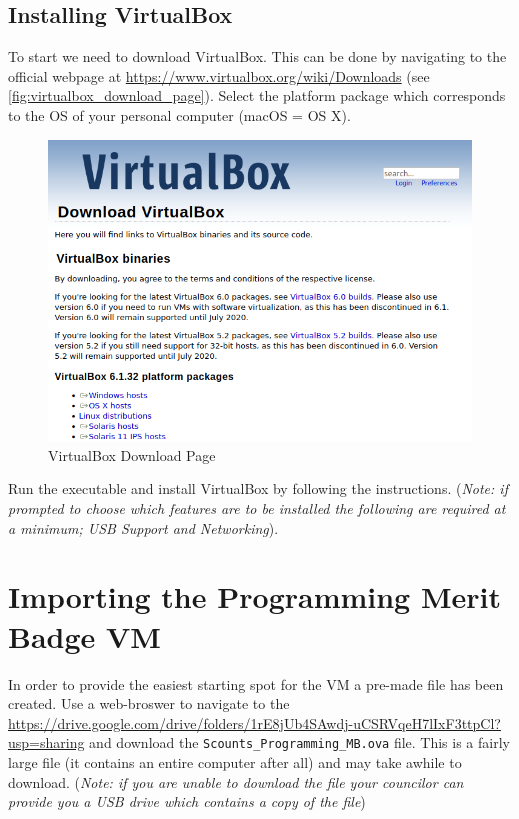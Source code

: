     \subsection{Installing VirtualBox}
    \label{ssec:installing_virtualbox}

      To start we need to download VirtualBox.
      This can be done by navigating to the official webpage at \href{https://www.virtualbox.org/wiki/Downloads}
        {https://www.virtualbox.org/wiki/Downloads} (see \autoref{fig:virtualbox_download_page}).
      Select the platform package which corresponds to the OS of your personal computer (macOS = OS X).
      
      \begin{figure}[ht]
        \centering
        \includegraphics[width=0.8\linewidth]{virtualbox_download_page.png}
        \caption{VirtualBox Download Page}
        \label{fig:virtualbox_download_page}
      \end{figure}
      \FloatBarrier

      Run the executable and install VirtualBox by following the instructions.
      (\textit{Note: if prompted to choose which features are to be installed the following are required at a minimum; USB Support and Networking}).

  \section{Importing the Programming Merit Badge VM}
  \label{sec:import_merit_badge_vm}

    In order to provide the easiest starting spot for the VM a pre-made file has been created.
    Use a web-broswer to navigate to the \href{Google Drive Folder}{https://drive.google.com/drive/folders/1rE8jUb4SAwdj-uCSRVqeH7lIxF3ttpCl?usp=sharing}
      and download the \texttt{Scounts_Programming_MB.ova} file.
    This is a fairly large file (it contains an entire computer after all) and may take awhile to download.
    (\textit{Note: if you are unable to download the file your councilor can provide you a USB drive which contains a copy of the file})

